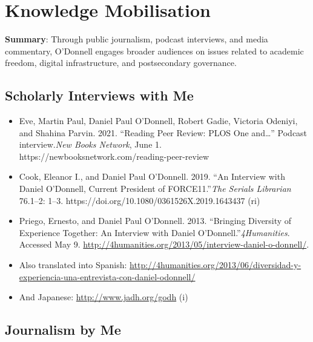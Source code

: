 \documentclass[12pt]{article}
\begin{document}
\section*{Knowledge Mobilisation}
\textbf{Summary}: Through public journalism, podcast interviews, and media commentary, O'Donnell engages broader audiences on issues related to academic freedom, digital infrastructure, and postsecondary governance.


\subsection*{Scholarly Interviews with Me}

\begin{itemize}
  \item Eve, Martin Paul, Daniel Paul O’Donnell, Robert Gadie\*, Victoria Odeniyi\*, and Shahina Parvin\*. 2021. “Reading Peer Review: PLOS One and…” Podcast interview.\textit{New Books Network}, June 1. https://newbooksnetwork.com/reading-peer-review
  \item Cook, Eleanor I., and Daniel Paul O’Donnell. 2019. “An Interview with Daniel O’Donnell, Current President of FORCE11.”\textit{The Serials Librarian} 76.1–2: 1–3. https://doi.org/10.1080/0361526X.2019.1643437 (ri)
  \item Priego, Ernesto, and Daniel Paul O’Donnell. 2013. “Bringing Diversity of Experience Together: An Interview with Daniel O’Donnell.”\textit{4Humanities}. Accessed May 9. \url{http://4humanities.org/2013/05/interview-daniel-o-donnell/}.
  \item Also translated into Spanish: \url{http://4humanities.org/2013/06/diversidad-y-experiencia-una-entrevista-con-daniel-odonnell/}
  \item And Japanese: \url{http://www.jadh.org/godh} (i)
\end{itemize}


\subsection*{Journalism by Me}
\end{document}
